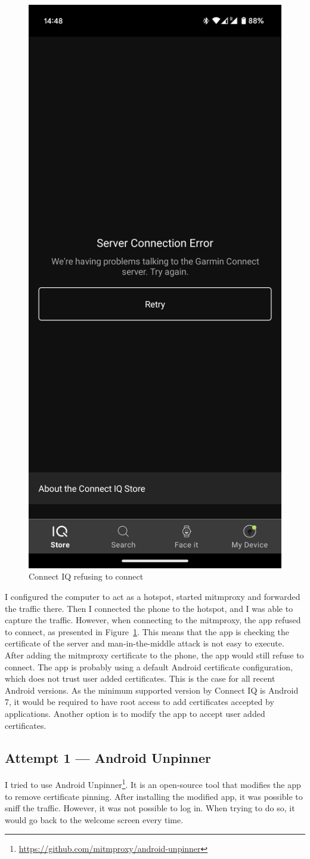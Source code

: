 \begin{figure}[h]
    \centering
    \includegraphics[width=0.3\linewidth]{../../images/connect-iq-connection-failed}
    \caption{Connect IQ refusing to connect}
    \label{fig:connect-iq-connection-failed}
\end{figure}

I configured the computer to act as a hotspot, started mitmproxy and forwarded the traffic there.
Then I connected the phone to the hotspot, and I was able to capture the traffic.
However, when connecting to the mitmproxy, the app refused to connect, as presented in Figure~\ref{fig:connect-iq-connection-failed}.
This means that the app is checking the certificate of the server and man-in-the-middle attack is not easy to execute.
After adding the mitmproxy certificate to the phone, the app would still refuse to connect.
The app is probably using a default Android certificate configuration, which does not trust user added certificates.
This is the case for all recent Android versions.
As the minimum supported version by Connect IQ is Android 7, it would be required to have root access to add certificates accepted by applications.
Another option is to modify the app to accept user added certificates.

\subsection*{Attempt 1 — Android Unpinner}
I tried to use Android Unpinner\footnote{\url{https://github.com/mitmproxy/android-unpinner}}.
It is an open-source tool that modifies the app to remove certificate pinning.
After installing the modified app, it was possible to sniff the traffic.
However, it was not possible to log in.
When trying to do so, it would go back to the welcome screen every time.

